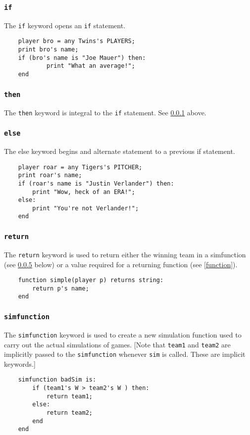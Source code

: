 \subsubsection{\texttt{if}} \label{if}
The \texttt{if} keyword opens an \texttt{if} statement.
\begin{verbatim}
    player bro = any Twins's PLAYERS;
    print bro's name;
    if (bro's name is "Joe Mauer") then:
            print "What an average!";
    end
\end{verbatim}

\subsubsection{\texttt{then}}
The \texttt{then} keyword is integral to the \texttt{if} statement. See \ref{if} above.

\subsubsection{\texttt{else}}
The else keyword begins and alternate statement to a previous if statement.
\begin{verbatim}
    player roar = any Tigers's PITCHER;
    print roar's name;
    if (roar's name is "Justin Verlander") then:
        print "Wow, heck of an ERA!";
    else:
        print "You're not Verlander!";
    end
\end{verbatim}

\subsubsection{\texttt{return}}
The \texttt{return} keyword is used to return either the winning team in a simfunction (see \ref{simfunction} below) or a value required for a returning function (see \ref{function}).
\begin{verbatim}
    function simple(player p) returns string:
        return p's name;
    end
\end{verbatim}

\subsubsection{\texttt{simfunction}} \label{simfunction}
The \texttt{simfunction} keyword is used to create a new simulation function used to carry out the actual simulations of games. [Note that \texttt{team1} and \texttt{team2} are implicitly passed to the \texttt{simfunction} whenever \texttt{sim} is called. These are implicit keywords.]
\begin{verbatim}
    simfunction badSim is:
        if (team1's W > team2's W ) then:
            return team1;
        else:
            return team2;
        end
    end

\end{verbatim}


